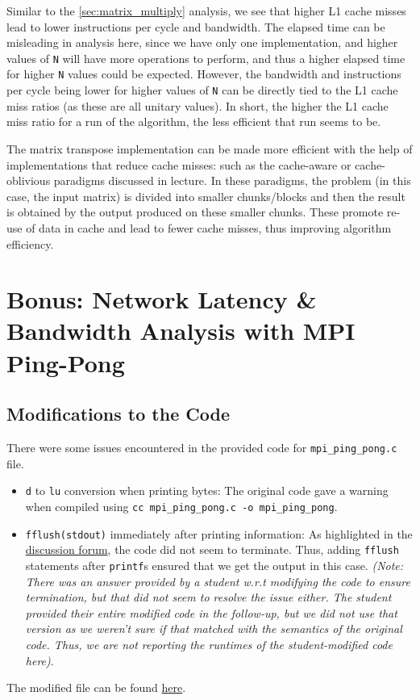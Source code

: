 \documentclass[a4paper,10pt]{article}
\begin{document}
Similar to the \ref{sec:matrix_multiply} analysis, we see that higher L1 cache misses lead to lower instructions per cycle and bandwidth. The elapsed time can be misleading in analysis here, since we have only one implementation, and higher values of \verb|N| will have more operations to perform, and thus a higher elapsed time for higher \verb|N| values could be expected. However, the bandwidth and instructions per cycle being lower for higher values of \verb|N| can be directly tied to the L1 cache miss ratios (as these are all unitary values). In short, the higher the L1 cache miss ratio for a run of the algorithm, the less efficient that run seems to be. 

The matrix transpose implementation can be made more efficient with the help of implementations that reduce cache misses: such as the cache-aware or cache-oblivious paradigms discussed in lecture. In these paradigms, the problem (in this case, the input matrix) is divided into smaller chunks/blocks and then the result is obtained by the output produced on these smaller chunks. These promote re-use of data in cache and lead to fewer cache misses, thus improving algorithm efficiency. 

\section{Bonus: Network Latency \& Bandwidth Analysis with MPI Ping-Pong}
\subsection{Modifications to the Code}
There were some issues encountered in the provided code for \verb|mpi_ping_pong.c| file. 
\begin{itemize}
\item \verb|d| to \verb|lu| conversion when printing bytes: The original code gave a warning when compiled using \verb|cc mpi_ping_pong.c -o mpi_ping_pong|. \\
\item \verb|fflush(stdout)| immediately after printing information: As highlighted in the \href{https://canvas.kth.se/courses/53216/discussion_topics/456480}{discussion forum}, the code did not seem to terminate. Thus, adding \verb|fflush| statements after \verb|printf|s ensured that we get the output in this case. \textit{(Note: There was an answer provided by a student w.r.t modifying the code to ensure termination, but that did not seem to resolve the issue either. The student provided their entire modified code in the follow-up, but we did not use that version as we weren't sure if that matched with the semantics of the original code. Thus, we are not reporting the runtimes of the student-modified code here)}. 
\end{itemize}
The modified file can be found \href{https://github.com/paulmyr/DD2356-MethodsHPC/blob/master/2_hpc_arch_perf_model/bonus/mpi_ping_pong.c}{here}.
\end{document}
